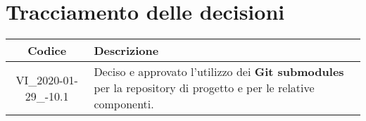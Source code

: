 \section*{Tracciamento delle decisioni}

\begin{center}
	\begin{longtable}{|c|p{12.25cm}|}
	\hline
	\rowcolor{lighter-grayer}
	\textbf{Codice} & \textbf{Descrizione} \\
	\hline
	\endfirsthead
	
	\hline
	VI\_2020-01-29\_-10.1 & Deciso e approvato l'utilizzo dei \textbf{Git submodules} per la repository di progetto e per le relative componenti. \\
	\hline

	\end{longtable}
\end{center}